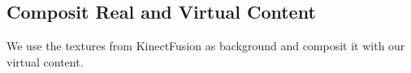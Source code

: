 \subsection{Composit Real and Virtual Content}
We use the textures from KinectFusion as background and composit it with our virtual content.